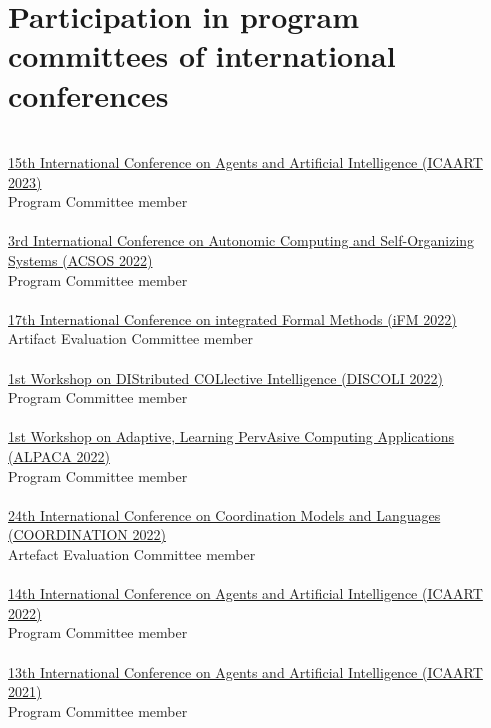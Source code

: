 \section{{\color{black}Participation in program committees of international conferences}}
\halfblankline \\
\href{https://icaart.scitevents.org/}{15th International Conference on Agents and Artificial Intelligence
(ICAART 2023)}
\\ Program Committee member \\
\halfblankline \\
\href{https://conf.researchr.org/home/acsos-2022/}{3rd International Conference on Autonomic Computing and Self-Organizing Systems
(ACSOS 2022)}
\\ Program Committee member \\
\halfblankline \\
\href{https://ifm22.si.usi.ch/}{17th International Conference on integrated Formal Methods
(iFM 2022)}
\\ Artifact Evaluation Committee member \\
\halfblankline \\
\href{https://discoli-workshop.github.io/2022/}{1st Workshop on DIStributed COLlective Intelligence
(DISCOLI 2022)}
\\ Program Committee member \\
\halfblankline \\
\href{https://www.discotec.org/2022/coordination}{1st Workshop on Adaptive, Learning PervAsive Computing Applications
(ALPACA 2022)}
\\ Program Committee member \\
\halfblankline \\
\href{https://www.discotec.org/2022/coordination}{24th International Conference on Coordination Models and Languages 
(COORDINATION 2022)}
\\ Artefact Evaluation Committee member \\
\halfblankline \\
\href{http://www.icaart.org/?y=2022}{14th International Conference on Agents and Artificial Intelligence 
(ICAART 2022)}
\\ Program Committee member \\
\halfblankline \\
\href{http://www.icaart.org/?y=2021}{13th International Conference on Agents and Artificial Intelligence 
(ICAART 2021)}
\\ Program Committee member \\
